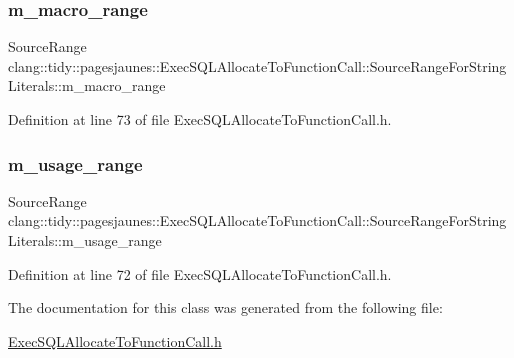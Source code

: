 \subsubsection{\texorpdfstring{m\+\_\+macro\+\_\+range}{m\_macro\_range}}
{\footnotesize\ttfamily Source\+Range clang\+::tidy\+::pagesjaunes\+::\+Exec\+S\+Q\+L\+Allocate\+To\+Function\+Call\+::\+Source\+Range\+For\+String\+Literals\+::m\+\_\+macro\+\_\+range}



Definition at line 73 of file Exec\+S\+Q\+L\+Allocate\+To\+Function\+Call.\+h.

\mbox{\label{classclang_1_1tidy_1_1pagesjaunes_1_1_exec_s_q_l_allocate_to_function_call_1_1_source_range_for_string_literals_a089b964c4f0342c8977ebe6fba7d8dbe}} 
\subsubsection{\texorpdfstring{m\+\_\+usage\+\_\+range}{m\_usage\_range}}
{\footnotesize\ttfamily Source\+Range clang\+::tidy\+::pagesjaunes\+::\+Exec\+S\+Q\+L\+Allocate\+To\+Function\+Call\+::\+Source\+Range\+For\+String\+Literals\+::m\+\_\+usage\+\_\+range}



Definition at line 72 of file Exec\+S\+Q\+L\+Allocate\+To\+Function\+Call.\+h.



The documentation for this class was generated from the following file\+:\begin{DoxyCompactItemize}
\item 
\hyperlink{_exec_s_q_l_allocate_to_function_call_8h}{Exec\+S\+Q\+L\+Allocate\+To\+Function\+Call.\+h}\end{DoxyCompactItemize}
